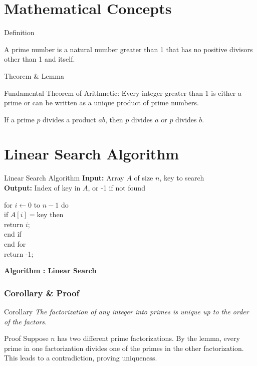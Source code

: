 \documentclass{beamer}
\begin{document}
	\section{Mathematical Concepts}
	\begin{frame}{Definition}
		\begin{definition}
			A \alert{prime number} is a natural number greater than 1 that has no positive divisors other than 1 and itself.
		\end{definition}
	\end{frame}
	
	\begin{frame}{Theorem \& Lemma}
		\begin{theorem}
			\alert{Fundamental Theorem of Arithmetic:} Every integer greater than 1 is either a prime or can be written as a unique product of prime numbers.
		\end{theorem}
		\begin{lemma}
			If a prime $p$ divides a product $ab$, then $p$ divides $a$ or $p$ divides $b$.
		\end{lemma}
	\end{frame}
	\setcounter{algorithmCounter}{0}
	\section{Linear Search Algorithm}
	\begin{frame}{Linear Search Algorithm}
		\textbf{Input:} Array $A$ of size $n$, key to search \\
		\textbf{Output:} Index of key in $A$, or -1 if not found
		
		\medskip
		for $i \gets 0$ to $n-1$ do\\
		\quad if $A[i] = \text{key}$ then\\
		\quad\quad return $i$;\\
		\quad end if\\
		end for\\
		return -1;
		
		\medskip
		\centering
		\textbf{Algorithm \thealgorithmCounter: Linear Search}
	\end{frame}
	
	\begin{frame}
		\frametitle{Corollary \& Proof}
		\begin{block}{Corollary}
			\emph{The factorization of any integer into primes is unique up to the order of the factors.}
		\end{block}
		
		\begin{block}{Proof}
			Suppose $n$ has two different prime factorizations. By the lemma, every prime in one factorization divides one of the primes in the other factorization. This leads to a contradiction, proving uniqueness.
		\end{block}
	\end{frame}
\end{document}

